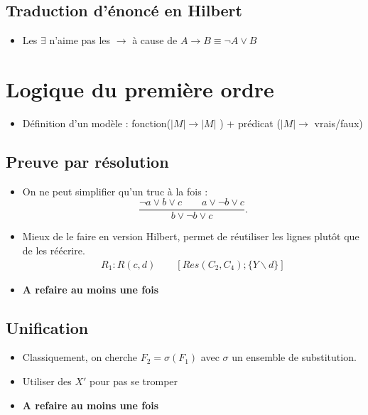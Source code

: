 \documentclass{article}
\theoremstyle{plain}%
\theoremstyle{definition}
\theoremstyle{remark}
\begin{document}
\subsection{Traduction d'énoncé en Hilbert}
\begin{itemize}
    \item Les $ \exists  $ n'aime pas les $ \rightarrow  $ à cause de $ A \to B \equiv \neg A \vee B $
\end{itemize}

\section{Logique du première ordre}
\begin{itemize}
    \item Définition d'un modèle : fonction($ \left| M \right| \to \left| M \right|  $ ) + prédicat ($ \left| M \right| \to  $ vrais/faux)
\end{itemize}

\subsection{Preuve par résolution}
\begin{itemize}
    \item On ne peut simplifier qu'un truc à la fois : 
        \[
            \frac{\neg a \vee b \vee c \qquad a \vee \neg b \vee c }{b \vee \neg b \vee c}
        .\]
    \item Mieux de le faire en version Hilbert, permet de réutiliser les lignes plutôt que de les réécrire.
        \begin{align*}
            R_1 : R(c,d) \qquad [Res(C_2, C_4) ; \{Y\backslash d\}]
        \end{align*}
    \item \textbf{A refaire au moins une fois}
\end{itemize}

\subsection{Unification}
\begin{itemize}
    \item Classiquement, on cherche $ F_2 = \sigma (F_1) $ avec $ \sigma  $ un ensemble de substitution.
    \item Utiliser des $ X \prime  $ pour pas se tromper
    \item \textbf{A refaire au moins une fois}
\end{itemize}
\end{document}
